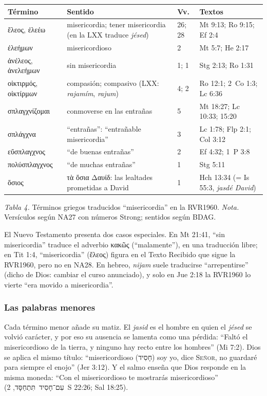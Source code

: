 \documentclass[11pt,letterpaper]{article}
\newcommand{\heb}[1]{\mbox{\foreignlanguage{hebrew}{#1}}}
\newcommand{\grc}[1]{\foreignlanguage{ancientgreek}{#1}}
\newcommand{\SENOR}{\textsc{Señor}}
\begin{document}
\begin{center}\small\renewcommand{\arraystretch}{1.2}
\begin{tabular}{@{}L{3.6cm}L{4.8cm}L{1.3cm}L{4.6cm}@{}}
\toprule
\textbf{Término} & \textbf{Sentido} & \textbf{Vv.} & \textbf{Textos} \\ \midrule
\grc{ἔλεος}, \grc{ἐλεέω} & misericordia; tener misericordia (en la LXX traduce \emph{jésed}) & 26; 28 & Mt 9:13; Ro 9:15; Ef 2:4 \\
\grc{ἐλεήμων} & misericordioso & 2 & Mt 5:7; He 2:17 \\
\grc{ἀνέλεος}, \grc{ἀνελεήμων} & sin misericordia & 1; 1 & Stg 2:13; Ro 1:31 \\
\grc{οἰκτιρμός}, \grc{οἰκτίρμων} & compasión; compasivo (LXX: \emph{rajamím}, \emph{rajum}) & 4; 2 & Ro 12:1; 2~Co 1:3; Lc 6:36 \\
\grc{σπλαγχνίζομαι} & conmoverse en las entrañas & 5 & Mt 18:27; Lc 10:33; 15:20 \\
\grc{σπλάγχνα} & ``entrañas'': ``entrañable misericordia'' & 3 & Lc 1:78; Flp 2:1; Col 3:12 \\
\grc{εὔσπλαγχνος} & ``de buenas entrañas'' & 2 & Ef 4:32; 1~P 3:8 \\
\grc{πολύσπλαγχνος} & ``de muchas entrañas'' & 1 & Stg 5:11 \\
\grc{ὅσιος} & \grc{τὰ ὅσια Δαυίδ}: las lealtades prometidas a David & 1 & Hch 13:34 (= Is 55:3, \emph{jasdé David}) \\
\bottomrule
\end{tabular}\par
{\footnotesize\color{gris}\textit{Tabla 4.} Términos griegos traducidos ``misericordia'' en la RVR1960. \textit{Nota.} Versículos según NA27 con números Strong; sentidos según BDAG.}
\end{center}

\begin{nota}[Precisión]
El Nuevo Testamento presenta dos casos especiales. En Mt 21:41, ``sin misericordia'' traduce el adverbio \grc{κακῶς} (``malamente''), en una traducción libre; en Tit 1:4, ``misericordia'' (\grc{ἔλεος}) figura en el Texto Recibido que sigue la RVR1960, pero no en NA28. En hebreo, \emph{nijam} suele traducirse ``arrepentirse'' (dicho de Dios: cambiar el curso anunciado), y solo en Jue 2:18 la RVR1960 lo vierte ``era movido a misericordia''.
\end{nota}

\subsubsection*{Las palabras menores}
Cada término menor añade su matiz. El \emph{jasid} es el hombre en quien el \emph{jésed} se volvió carácter, y por eso su ausencia se lamenta como una pérdida: ``Faltó el misericordioso de la tierra, y ninguno hay recto entre los hombres'' (Mi 7:2). Dios se aplica el mismo título: ``misericordioso (\heb{חָסִיד}) soy yo, dice \SENOR, no guardaré para siempre el enojo'' (Jer 3:12). Y el salmo enseña que Dios responde en la misma moneda: ``Con el misericordioso te mostrarás misericordioso'' (\heb{עִם־חָסִיד תִּתְחַסָּד}, 2~S 22:26; Sal 18:25).
\end{document}
